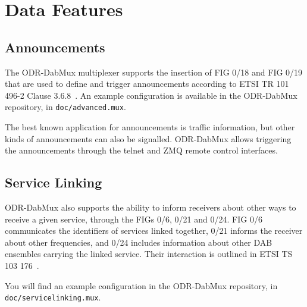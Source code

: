 \section{Data Features}
\subsection{Announcements}
The ODR-DabMux multiplexer supports the insertion of FIG 0/18 and FIG 0/19 that
are used to define and trigger announcements according to ETSI TR 101 496-2
Clause 3.6.8~\cite{etsitr1014962}.
An example configuration is available in the ODR-DabMux repository, in
\texttt{doc/advanced.mux}.

The best known application for announcements is traffic information, but other
kinds of announcements can also be signalled. ODR-DabMux allows triggering the
announcements through the telnet and ZMQ remote control interfaces.

\subsection{Service Linking}
ODR-DabMux also supports the ability to inform receivers about other ways to
receive a given service, through the FIGs 0/6, 0/21 and 0/24. FIG 0/6
communicates the identifiers of services linked together, 0/21 informs the
receiver about other frequencies, and 0/24 includes information about other DAB
ensembles carrying the linked service.
Their interaction is outlined in ETSI TS 103 176~\cite{etsits103176}.

You will find an example configuration in the ODR-DabMux repository, in
\texttt{doc/servicelinking.mux}.

